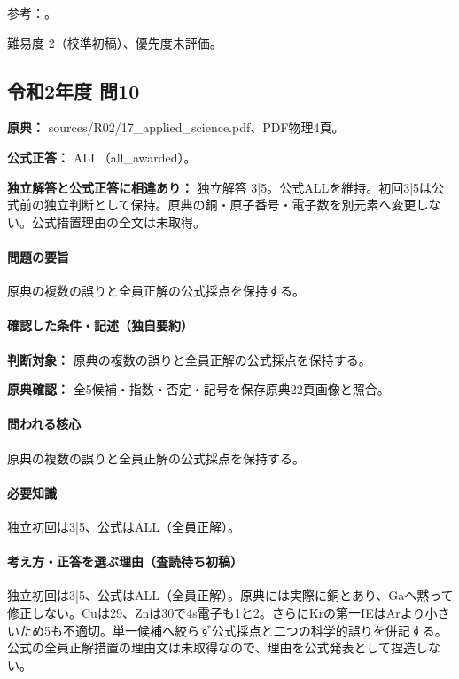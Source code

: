 \par 参考：\cite{atomic_quantum,atomic_nist2019}。

\par 難易度 2（校準初稿）、優先度未評価。

\subsection{令和2年度 問10}
\label{q:r02-reg-applied-10}

\noindent\textbf{原典：} sources/R02/17\_applied\_science.pdf、PDF物理4頁。

\textbf{公式正答：} ALL（all\_awarded）。

\par\textbf{独立解答と公式正答に相違あり：} 独立解答 3|5。公式ALLを維持。初回3|5は公式前の独立判断として保持。原典の銅・原子番号・電子数を別元素へ変更しない。公式措置理由の全文は未取得。

\paragraph{問題の要旨} 原典の複数の誤りと全員正解の公式採点を保持する。

\paragraph{確認した条件・記述（独自要約）}\mbox{}\par

\noindent\textbf{判断対象：} 原典の複数の誤りと全員正解の公式採点を保持する。\par

\noindent\textbf{原典確認：} 全5候補・指数・否定・記号を保存原典22頁画像と照合。\par

\paragraph{問われる核心} 原典の複数の誤りと全員正解の公式採点を保持する。

\paragraph{必要知識} 独立初回は3|5、公式はALL（全員正解）。

\paragraph{考え方・正答を選ぶ理由（査読待ち初稿）} 独立初回は3|5、公式はALL（全員正解）。原典には実際に銅とあり、Gaへ黙って修正しない。Cuは29、Znは30で4s電子も1と2。さらにKrの第一IEはArより小さいため5も不適切。単一候補へ絞らず公式採点と二つの科学的誤りを併記する。公式の全員正解措置の理由文は未取得なので、理由を公式発表として捏造しない。

